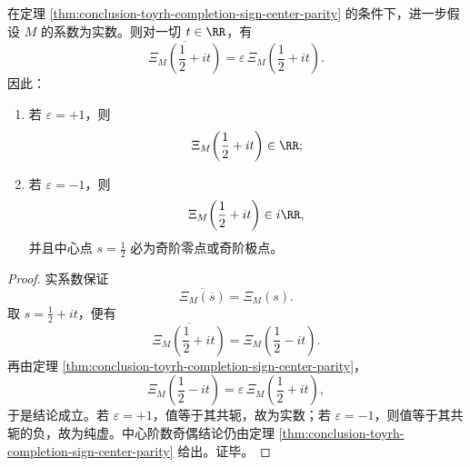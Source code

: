 \begin{corollary}\label{cor:conclusion-toyrh-real-kernel-critical-line-real-imaginary-dichotomy}
在定理 \ref{thm:conclusion-toyrh-completion-sign-center-parity} 的条件下，进一步假设 \(M\) 的系数为实数。则对一切 \(t\in \RR\)，有
\[
\overline{\Xi_M\!\left(\frac12+it\right)}
=
\varepsilon\,\Xi_M\!\left(\frac12+it\right).
\]
因此：
\begin{enumerate}
  \item 若 \(\varepsilon=+1\)，则
  \[
  \Xi_M\!\left(\frac12+it\right)\in \RR;
  \]
  \item 若 \(\varepsilon=-1\)，则
  \[
  \Xi_M\!\left(\frac12+it\right)\in i\RR,
  \]
  并且中心点 \(s=\frac12\) 必为奇阶零点或奇阶极点。
\end{enumerate}
\end{corollary}
\begin{proof}
实系数保证
\[
\overline{\Xi_M(\overline s)}=\Xi_M(s).
\]
取 \(s=\frac12+it\)，便有
\[
\overline{\Xi_M\!\left(\frac12+it\right)}
=
\Xi_M\!\left(\frac12-it\right).
\]
再由定理 \ref{thm:conclusion-toyrh-completion-sign-center-parity}，
\[
\Xi_M\!\left(\frac12-it\right)
=
\varepsilon\,\Xi_M\!\left(\frac12+it\right),
\]
于是结论成立。若 \(\varepsilon=+1\)，值等于其共轭，故为实数；若 \(\varepsilon=-1\)，则值等于其共轭的负，故为纯虚。中心阶数奇偶结论仍由定理 \ref{thm:conclusion-toyrh-completion-sign-center-parity} 给出。证毕。
\end{proof}

